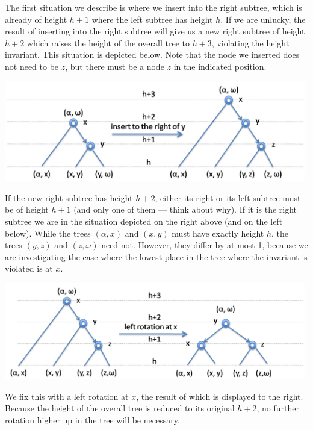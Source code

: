 The first situation we describe is where we insert into the right
subtree, which is already of height $h+1$ where the left subtree has
height $h$.  If we are unlucky, the result of inserting into the right
subtree will give us a new right subtree of height $h+2$ which raises
the height of the overall tree to $h+3$, violating the height
invariant.  This situation is depicted below.  Note that the node we
inserted does not need to be $z$, but there must be a node $z$ in
the indicated position.
\begin{center}
  \includegraphics[width=0.99\textwidth]{img/avl7a.png}
\end{center}
If the new right subtree has height $h+2$, either its right or its
left subtree must be of height $h+1$ (and only one of them --- think
about why). If it is the right subtree we are in the situation
depicted on the right above (and on the left below).  While the trees
$(\alpha, x)$ and $(x, y)$ must have exactly height $h$, the trees
$(y, z)$ and $(z, \omega)$ need not.  However, they differ by at most
1, because we are investigating the case where the lowest place in
the tree where the invariant is violated is at $x$.
\begin{center}
  \includegraphics[width=0.99\textwidth]{img/avl7.png}
\end{center}
We fix this with a left rotation at $x$, the result of which is displayed to
the right.  Because the height of the overall tree is reduced to its
original $h+2$, no further rotation higher up in the tree will be
necessary.

